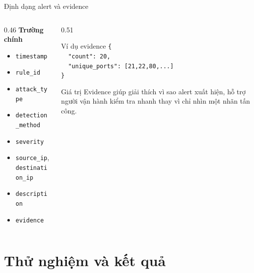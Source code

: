 \documentclass[t, aspectratio=169]{beamer}
\begin{document}
\begin{frame}{Định dạng alert và evidence}
    \begin{columns}[T,onlytextwidth]
        \begin{column}{0.46\textwidth}
            \textbf{Trường chính}
            \begin{itemize}
                \item \texttt{timestamp}
                \item \texttt{rule\_id}
                \item \texttt{attack\_type}
                \item \texttt{detection\_method}
                \item \texttt{severity}
                \item \texttt{source\_ip}, \texttt{destination\_ip}
                \item \texttt{description}
                \item \texttt{evidence}
            \end{itemize}
        \end{column}
        \begin{column}{0.51\textwidth}
            \begin{block}{Ví dụ evidence}
                \footnotesize
                \texttt{\{}\\
                \texttt{\ \ "count": 20,}\\
                \texttt{\ \ "unique\_ports": [21,22,80,...]}\\
                \texttt{\}}
            \end{block}
            \begin{block}{Giá trị}
                Evidence giúp giải thích vì sao alert xuất hiện, hỗ trợ người vận hành kiểm tra nhanh thay vì chỉ nhìn một nhãn tấn công.
            \end{block}
        \end{column}
    \end{columns}
\end{frame}

\section{Thử nghiệm và kết quả}
\end{document}
